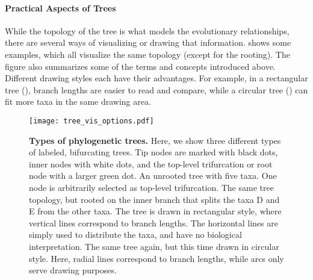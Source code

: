 \paragraph{Practical Aspects of Trees}
\label{ch:Foundations:sec:TreeOfLife:sub:PhylogeneticTrees:par:PracticalAspects}

While the topology of the tree is what models the evolutionary relationships,
there are several ways of visualizing or drawing that information.
 shows some examples, which all visualize the same topology (except for the rooting).
The figure also summarizes some of the terms and concepts introduced above.
Different drawing styles each have their advantages.
For example, in a rectangular tree (),
branch lengths are easier to read and compare,
while a circular tree () can fit more taxa in the same drawing area.

\begin{figure}[hpbt]
    \centering
    \texttt{[image: tree\_vis\_options.pdf]}
    \begin{subfigure}{0pt}
        \label{fig:tree_vis_options:sub:unrooted}
    \end{subfigure}
    \begin{subfigure}{0pt}
        \label{fig:tree_vis_options:sub:rectangular}
    \end{subfigure}
    \begin{subfigure}{0pt}
        \label{fig:tree_vis_options:sub:circular}
    \end{subfigure}
    \caption[Types of phylogenetic trees]{
        \textbf{Types of phylogenetic trees.}
        Here, we show three different types of labeled, bifurcating trees.
        Tip nodes are marked with black dots, inner nodes with white dots,
        and the top-level trifurcation or root node with a larger green dot.
        An unrooted tree with five taxa. One node is arbitrarily selected as top-level trifurcation.
        The same tree topology,
        but rooted on the inner branch that splits the taxa {\sffamily D} and {\sffamily E} from the other taxa.
        The tree is drawn in rectangular style,
        where vertical lines correspond to branch lengths.
        The horizontal lines are simply used to distribute the taxa, and have no biological interpretation.
        The same tree again, but this time drawn in circular style.
        Here, radial lines correspond to branch lengths, while arcs only serve drawing purposes.
    }
    \label{fig:tree_vis_options}
\end{figure}

